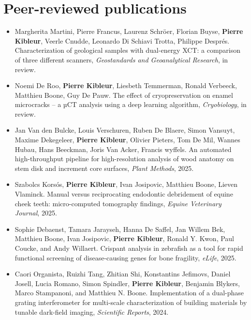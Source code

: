 \documentclass[oneside, english, 10pt, a4paper]{memoir}
\begin{document}
	
	\section{Peer-reviewed publications}
	\begin{itemize}[leftmargin=*]   	    	
		\item Margherita Martini, Pierre Francus, Laurenz Schröer, Florian Buyse, \textbf{Pierre Kibleur}, Veerle Cnudde, Leonardo Di Schiavi Trotta, Philippe Després. Characterization of geological samples with dual-energy XCT: a comparison of three different scanners, \emph{Geostandards and Geoanalytical Research}, in review.
		
		\item Noemi De Roo, \textbf{Pierre Kibleur}, Liesbeth Temmerman, Ronald Verbeeck, Matthieu Boone, Guy De Pauw. The effect of cryopreservation on enamel microcracks – a µCT analysis using a deep learning algorithm, \emph{Cryobiology}, in review. 
		
		\item Jan Van den Bulcke, Louis Verschuren, Ruben De Blaere, Simon Vansuyt, Maxime Dekegeleer, \textbf{Pierre Kibleur}, Olivier Pieters, Tom De Mil, Wannes Hubau, Hans Beeckman, Joris Van Acker, Francis wyffels. An automated high-throughput pipeline for high-resolution analysis of wood anatomy on stem disk and increment core surfaces, \emph{Plant Methods}, 2025.
			
		\item Szabolcs Korsós, \textbf{Pierre Kibleur}, Ivan Josipovic, Matthieu Boone, Lieven Vlaminck. Manual versus reciprocating endodontic debridement of equine cheek teeth: micro-computed tomography findings, \emph{Equine Veterinary Journal}, 2025.
		
		\item Sophie Debaenst, Tamara Jarayseh, Hanna De Saffel, Jan Willem Bek, Matthieu Boone, Ivan Josipovic, \textbf{Pierre Kibleur}, Ronald Y. Kwon, Paul Coucke, and Andy Willaert. Crispant analysis in zebrafish as a tool for rapid functional screening of disease-causing genes for bone fragility, \emph{eLife}, 2025.
		
		\item Caori Organista, Ruizhi Tang, Zhitian Shi, Konstantins Jefimovs, Daniel Josell, Lucia Romano, Simon Spindler, \textbf{Pierre Kibleur}, Benjamin Blykers, Marco Stampanoni, and Matthieu N. Boone. Implementation of a dual-phase grating interferometer for multi-scale characterization of building materials by tunable dark-field imaging, \emph{Scientific Reports}, 2024.
		

\end{itemize}
\end{document}
